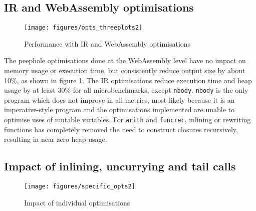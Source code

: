 \subsection{IR and WebAssembly optimisations}
\vspace{-0.4cm}
\begin{figure}[H]
\vspace{-0.05cm}
\hspace{-0.8cm}
\texttt{[image: figures/opts\_threeplots2]}
\vspace{-0.7cm}
\caption{Performance with IR and WebAssembly optimisations}
 \label{fig:opts} 
\end{figure}
The peephole optimisations done at the WebAssembly level have no impact on memory usage or execution time, but consistently reduce output size by about 10\%, as shown in figure \ref{fig:opts}. The IR optimisations reduce execution time and heap usage by at least 30\% for all microbenchmarks, except \verb|nbody|. \verb|nbody| is the only program which does not improve in all metrics, most likely because it is an imperative-style program and the optimisations implemented are unable to optimise uses of mutable variables.
 For \verb|arith| and \verb|funcrec|, inlining or rewriting functions has completely removed the need to construct closures recursively, resulting in near zero heap usage. %

\subsection{Impact of inlining, uncurrying and tail calls}
\vspace{-0.4cm}
\begin{figure}[H]
\hspace{-1.5cm}
\texttt{[image: figures/specific\_opts2]}
\vspace{-0.8cm}
\caption{Impact of individual optimisations}
 \label{fig:specific-opts} 
\end{figure}

